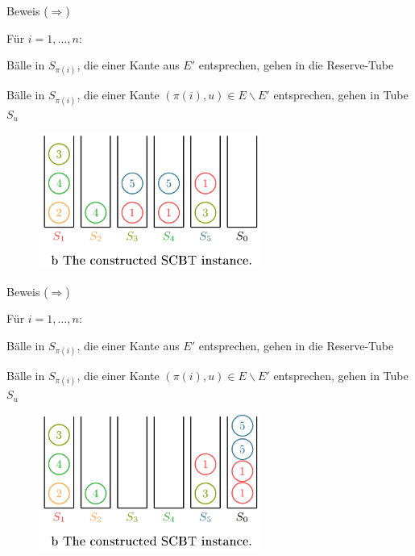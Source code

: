 \documentclass{beamer}
\begin{document}
\begin{frame}{Beweis (\glqq $\Rightarrow$\grqq)}
\begin{pointlist}
\item Für $i=1,\dots,n$:
\begin{arrowlist}
\item Bälle in $S_{\pi(i)}$, die einer Kante aus $E'$ entsprechen, gehen in die Reserve-Tube 
\item Bälle in $S_{\pi(i)}$, die einer Kante $(\pi(i),u)\in E\backslash E'$ entsprechen, gehen in Tube $S_u$
\end{arrowlist}
\end{pointlist}
\begin{figure}
    \centering
    \includegraphics[width=0.65\textwidth]{constgraph}
\end{figure}
\end{frame}

\begin{frame}{Beweis (\glqq $\Rightarrow$\grqq)}
\begin{pointlist}
\item Für $i=1,\dots,n$:
\begin{arrowlist}
\item Bälle in $S_{\pi(i)}$, die einer Kante aus $E'$ entsprechen, gehen in die Reserve-Tube 
\item Bälle in $S_{\pi(i)}$, die einer Kante $(\pi(i),u)\in E\backslash E'$ entsprechen, gehen in Tube $S_u$
\end{arrowlist}
\end{pointlist}
\begin{figure}
    \centering
    \includegraphics[width=0.65\textwidth]{proofr1}
\end{figure}
\end{frame}
\end{document}
